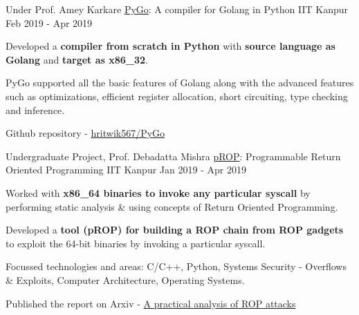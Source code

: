 \begin{cventries}


  \cventry
    {Under Prof. Amey Karkare} %
    {\href{https://github.com/hritwik567/PyGo}{PyGo}: A compiler for Golang in Python} %
    {IIT Kanpur} %
    {Feb 2019 - Apr 2019} %
    {
      \begin{cvitems} %
      \item {Developed a \textbf{compiler from scratch in Python} with \textbf{source language as Golang} and \textbf{target as x86\_32}.}
      \item {PyGo supported all the basic features of Golang along with the advanced features such as optimizations, efficient register allocation, short circuiting, type checking and inference.}
      \item {Github repository - \href{https://github.com/hritwik567/PyGo}{hritwik567/PyGo}}
      \end{cvitems}
    }



  \cventry
    {Undergraduate Project, Prof. Debadatta Mishra} %
    {\href{https://arxiv.org/abs/2111.03537}{pROP}: Programmable Return Oriented Programming} %
    {IIT Kanpur} %
    {Jan 2019 - Apr 2019} %
    {
      \begin{cvitems} %
      \item {Worked with \textbf{x86\_64 binaries to invoke any particular syscall} by performing static analysis \& using concepts of Return Oriented Programming.}
      \item {Developed a \textbf{tool (pROP) for building a ROP chain from ROP gadgets} to exploit the 64-bit binaries by invoking a particular syscall.}
      \item {Focussed technologies and areas: C/C++, Python, Systems Security - Overflows \& Exploits, Computer Architecture, Operating Systems.}
      \item {Published the report on Arxiv - \href{https://arxiv.org/abs/2111.03537}{A practical analysis of ROP attacks}}
      \end{cvitems}
    }





\end{cventries}
